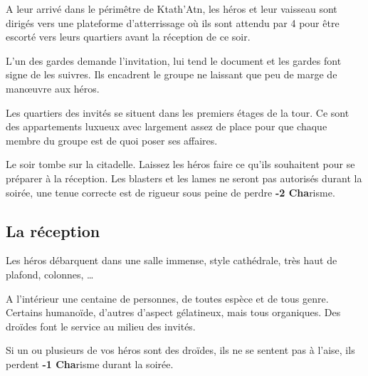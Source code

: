 A leur arrivé dans le périmêtre de Ktath’Atn, les héros et leur vaisseau sont dirigés vers une plateforme d’atterrissage où ils sont attendu par 4  pour être escorté vers leurs quartiers avant la réception de ce soir.

L’un des gardes demande l’invitation,  lui tend le document et les gardes font signe de les suivres. Ils encadrent le groupe ne laissant que peu de marge de manœuvre aux héros.

Les quartiers des invités se situent dans les premiers étages de la tour. Ce sont des appartements luxueux avec largement assez de place pour que chaque membre du groupe est de quoi poser ses affaires.

Le soir tombe sur la citadelle. Laissez les héros faire ce qu’ils souhaitent pour se préparer à la réception. Les blasters et les lames ne seront pas autorisés durant la soirée, une tenue correcte est de rigueur sous peine de perdre \textbf{-2 Cha}risme. 

\subsection{La réception}

Les héros débarquent dans une salle immense, style cathédrale, très haut de plafond, colonnes, \dots

A l’intérieur une centaine de personnes, de toutes espèce et de tous genre. Certains humanoïde, d’autres d’aspect gélatineux, mais tous organiques. Des droïdes font le service au milieu des invités. 

Si un ou plusieurs de vos héros sont des droïdes, ils ne se sentent pas à l’aise, ils perdent \textbf{-1 Cha}risme durant la soirée.

